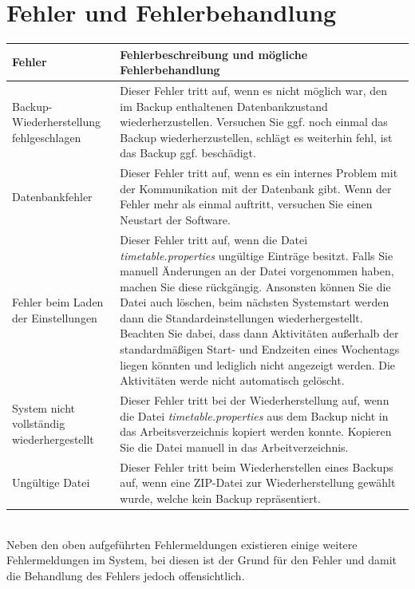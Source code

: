 \documentclass[fontsize=12pt]{scrartcl}
\begin{document}
\section{Fehler und Fehlerbehandlung}
\renewcommand{\arraystretch}{1.5}
\begin{tabularx}{\textwidth}{|p{5cm}|X|}
\hline
\textbf{Fehler} & \textbf{Fehlerbeschreibung und mögliche Fehlerbehandlung}\\\hline
Backup-Wiederherstellung fehlgeschlagen & Dieser Fehler tritt auf, wenn es nicht möglich war, den im Backup enthaltenen Datenbankzustand wiederherzustellen. Versuchen Sie ggf. noch einmal das Backup wiederherzustellen, schlägt es weiterhin fehl, ist das Backup ggf. beschädigt.\\\hline
Datenbankfehler & Dieser Fehler tritt auf, wenn es ein internes Problem mit der Kommunikation mit der Datenbank gibt. Wenn der Fehler mehr als einmal auftritt, versuchen Sie einen Neustart der Software.\\\hline
Fehler beim Laden der Einstellungen & Dieser Fehler tritt auf, wenn die Datei \textit{timetable.properties} ungültige Einträge besitzt. Falls Sie manuell Änderungen an der Datei vorgenommen haben, machen Sie diese rückgängig. Ansonsten können Sie die Datei auch löschen, beim nächsten Systemstart werden dann die Standardeinstellungen wiederhergestellt. Beachten Sie dabei, dass dann Aktivitäten außerhalb der standardmäßigen Start- und Endzeiten eines Wochentags liegen könnten und lediglich nicht angezeigt werden. Die Aktivitäten werde nicht automatisch gelöscht.\\\hline
System nicht vollständig wiederhergestellt & Dieser Fehler tritt bei der Wiederherstellung auf, wenn die Datei \textit{timetable.properties} aus dem Backup nicht in das Arbeitsverzeichnis kopiert werden konnte. Kopieren Sie die Datei manuell in das Arbeitverzeichnis.\\\hline
Ungültige Datei & Dieser Fehler tritt beim Wiederherstellen eines Backups auf, wenn eine ZIP-Datei zur Wiederherstellung gewählt wurde, welche kein Backup repräsentiert.\\\hline
\end{tabularx}\\

Neben den oben aufgeführten Fehlermeldungen existieren einige weitere Fehlermeldungen im System, bei diesen ist der Grund für den Fehler und damit die Behandlung des Fehlers jedoch offensichtlich.
\end{document}
